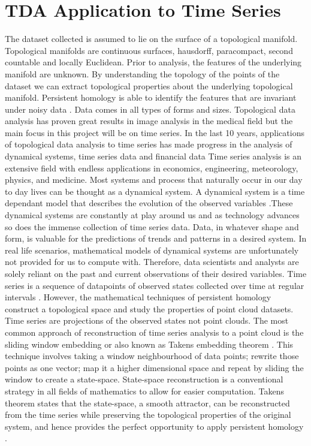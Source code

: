 \documentclass{article}
\begin{document}
\section{TDA Application to Time Series}
The dataset collected is assumed to lie on the surface of a topological manifold. Topological manifolds are continuous surfaces, hausdorff, paracompact, second countable and locally Euclidean. Prior to analysis, the features of the underlying manifold are unknown. By understanding the topology of the points of the dataset we can extract topological properties about the underlying topological manifold.  Persistent homology is able to identify the features that are invariant under noisy data \cite{smith2020topological}. Data comes in all types of forms and sizes. Topological data analysis has proven great results in image analysis in the medical field but the main focus in this project will be on time series. In the last 10 years, applications of topological data analysis to time series has made progress in the analysis of dynamical systems, time series data and financial data \cite{Gidea2017TopologicalDA}\cite{CarlssonTDAappli}\cite{IntroTDADATAscientists}\cite{ravishanker2019topological}\cite{Umeda2019TopologicalDA} Time series analysis is an extensive field with endless applications in economics, engineering, meteorology, physics, and medicine. Most systems and process that naturally occur in our day to day lives can be thought as a dynamical system. A dynamical system is a time dependant model that describes the evolution of the observed variables \cite{Kuznetsov2023}\cite{dynamicalsystemsHiroki}.These dynamical systems are constantly at play around us and as technology advances so does the immense collection of time series data. Data, in whatever shape and form, is valuable for the predictions of trends and patterns in a desired system. In real life scenarios, mathematical models of dynamical systems are unfortunately not provided for us to compute with. Therefore, data scientists and analysts are solely reliant on the past and current observations of their desired variables. Time series is a sequence of datapoints of observed states collected over time at regular intervals \cite{yap2011stable}. However, the mathematical techniques of persistent homology construct a topological space and study the properties of point cloud datasets. Time series are projections of the observed states not point clouds. The most common approach of reconstruction of time series analysis to a point cloud is the sliding window embedding or also known as Takens embedding theorem \cite{akingbade2023topological}\cite{ravishanker2019topological}\cite{Gidea2017TopologicalDA}\cite{Perea_2014}. This technique involves taking a window neighbourhood of data points; rewrite those points as one vector; map it a higher dimensional space and repeat by sliding the window to create a state-space. State-space reconstruction is a conventional strategy in all fields of mathematics to allow for easier computation.  Takens theorem states that the state-space, a smooth attractor, can be reconstructed from the time series while preserving the topological properties of the original system, and hence provides the perfect opportunity to apply persistent homology \cite{doi:10.1142/S0218127491000634}. 
\end{document}

